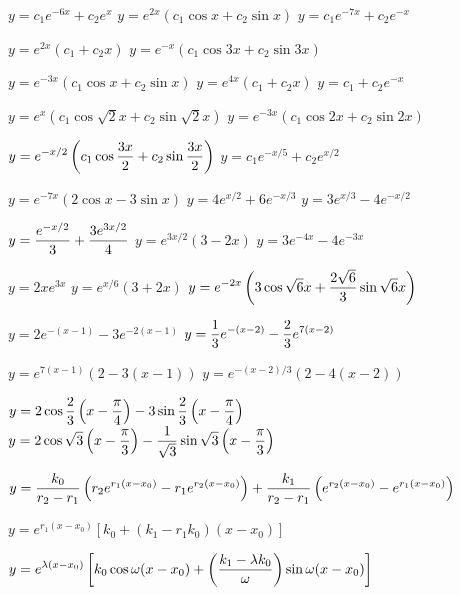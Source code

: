 \medskip

 $y=c_{1}e^{-6x}+c_{2}e^{x}$
  $y=e^{2x}(c_{1}\cos x+c_{2}\sin x)$
 $y=c_{1}e^{-7x}+c_{2}e^{-x}$

 $y=e^{2x}(c_{1}+c_{2}x)$
  $y=e^{-x}(c_{1}\cos3x+c_{2}\sin3x)$

  $y=e^{-3x}(c_{1}\cos x+c_{2}\sin x)$
 $y=e^{4x}(c_{1}+c_{2}x)$
 $y=c_{1}+c_{2}e^{-x}$

  $y=e^{x}(c_{1}\cos\sqrt{2}x+c_{2}\sin\sqrt{2}x)$
 $y=e^{-3x}(c_{1}\cos2x+c_{2}\sin2x)$

 $\displaystyle{y=e^{-x/2}\left(c_{1}\cos\frac{3x}{2}+c_{2}\sin
\frac{3x}{2}\right)}$
 $y=c_{1}e^{-x/5}+c_{2}e^{x/2}$

  $y=e^{-7x}(2\cos x-3\sin x)$
  $y=4e^{x/2}+6e^{-x/3}$
  $y=3e^{x/3}-4e^{-x/2}$

 $y=\displaystyle\frac{e^{-x/2}}{3}+\displaystyle\frac{3e^{3x/2}}{4}$
  $y=e^{3x/2}(3-2x)$
  $y=3e^{-4x}-4e^{-3x}$

  $y=2xe^{3x}$
  $y=e^{x/6}(3+2x)$
 $\displaystyle{y=e^{-2x}\left(3\cos\sqrt{6}x+\frac{2\sqrt{6}}{3}
\sin\sqrt{6}x\right)}$

 $y=2e^{-(x-1)}-3e^{-2(x-1)}$
 $y=\displaystyle{\frac{1}{3}e^{-(x-2)}-\frac{2}{3}e^{7(x-2)}}$

 $y=e^{7(x-1)}\left(2-3(x-1)\right)$
 $y=e^{-(x-2)/3}\left(2-4(x-2)\right)$

 $y=\displaystyle{2\cos
\frac{2}{3}\left(x-\frac{\pi}{4}\right)-3\sin
\frac{2}{3}\left(x-\frac{\pi}{4}\right)}$
$y=\displaystyle{2\cos\sqrt{3}\left(x-\frac{\pi}{3}\right)-\frac{1}{\sqrt{3}}\sin
\sqrt{3}\left(x-\frac{\pi}{3}\right)}$

$y=\displaystyle{\frac{k_{0}}{r_{2}-r_{1}}\left(r_{2}e^{r_{1}(x-x_{0})}-r_{1}e^{r_{2}(x-x_{0})}\right)+\frac{k_{1}}{r_{2}-r_{1}}\left(e^{r_{2}(x-x_{0})}-e^{r_{1}(x-x_{0})}\right)}$

$y=e^{r_{1}(x-x_{0})}\left[k_{0}+(k_{1}-r_{1}k_{0})(x-x_{0})\right]$

$y=\displaystyle{e^{\lambda(x-x_{0})}\left[k_{0}\cos\omega(x-x_{0})+\left(\frac{k_{1}-\lambda
k_{0}}{\omega}\right)\sin\omega(x-x_{0})\right]}$

